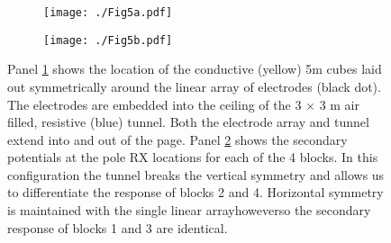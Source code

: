\documentclass[preprint,authoryear,12pt]{elsarticle}
\providecommand{\DIFaddtex}[1]{{\protect\color{blue}\uwave{#1}}} %
\providecommand{\DIFaddFL}[1]{\DIFadd{#1}} %
\providecommand{\DIFaddbeginFL}{} %
\providecommand{\DIFaddendFL}{} %
\providecommand{\DIFdelbeginFL}{} %
\providecommand{\DIFdelendFL}{} %
\providecommand{\DIFadd}[1]{\texorpdfstring{\DIFaddtex{#1}}{#1}} %
\begin{document}
\begin{figure}[htp]
   \begin{center}
      \begin{subfigure}{0.4\linewidth}
         \DIFdelbeginFL %
\DIFdelendFL \DIFaddbeginFL \texttt{[image: ./Fig5a.pdf]}
         \DIFaddendFL \caption{}
         \label{fig:4Blocks_Tunnel_Model}
      \end{subfigure}
      \hfill
      \begin{subfigure}{0.59\linewidth}
         \DIFdelbeginFL %
\DIFdelendFL \DIFaddbeginFL \texttt{[image: ./Fig5b.pdf]}
         \DIFaddendFL \caption{}
         \label{fig:4Blocks_Tunnel_Vs}
      \end{subfigure}
   \end{center}
\caption{Panel \ref{fig:4Blocks_Tunnel_Model} shows the location of the conductive (yellow) 5m cubes laid out symmetrically around the linear array of electrodes (black dot). The electrodes are embedded into the ceiling of the 3 $\times$ 3 m air filled, resistive (blue) tunnel. Both the electrode array and tunnel extend into and out of the page. Panel \ref{fig:4Blocks_Tunnel_Vs} shows the secondary potentials at the pole RX locations for each of the 4 blocks. In this configuration the tunnel breaks the vertical symmetry and allows us to differentiate the response of blocks 2 and 4. Horizontal symmetry is maintained with the single linear array\DIFaddbeginFL \DIFaddFL{, }\DIFaddendFL however\DIFaddbeginFL \DIFaddFL{, }\DIFaddendFL so the secondary response of blocks 1 and 3 are identical.}
\label{fig:4Blocks_Tunnel}
\end{figure}
\end{document}
